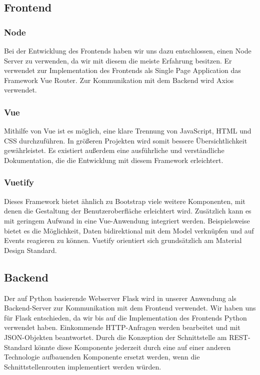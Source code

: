 \subsection{Frontend}

\subsubsection{Node}

Bei der Entwicklung des Frontends haben wir uns dazu entschlossen, einen Node Server zu verwenden, da wir mit diesem die meiste Erfahrung besitzen. Er verwendet zur Implementation des Frontends als Single Page Application das Framework Vue Router. Zur Kommunikation mit dem Backend wird Axios verwendet.

\subsubsection{Vue}

Mithilfe von Vue ist es möglich, eine klare Trennung von JavaScript, HTML und CSS durchzuführen. In größeren Projekten wird somit bessere Übersichtlichkeit gewährleistet. Es existiert außerdem eine ausführliche und verständliche Dokumentation, die die Entwicklung mit diesem Framework erleichtert.

\subsubsection{Vuetify}

Dieses Framework bietet ähnlich zu Bootstrap viele weitere Komponenten, mit denen die Gestaltung der Benutzeroberfläche erleichtert wird. Zusätzlich kann es mit geringem Aufwand in eine Vue-Anwendung integriert werden. Beispielsweise bietet es die Möglichkeit, Daten bidirektional mit dem Model verknüpfen und auf Events reagieren zu können. Vuetify orientiert sich grundsätzlich am Material Design Standard.

\subsection{Backend}

Der auf Python basierende Webserver Flask wird in unserer Anwendung als Backend-Server zur Kommunikation mit dem Frontend verwendet. Wir haben uns für Flask entschieden, da wir bis auf die Implementation des Frontends Python verwendet haben. Einkommende HTTP-Anfragen werden bearbeitet und mit JSON-Objekten beantwortet. Durch die Konzeption der Schnittstelle am REST-Standard könnte diese Komponente jederzeit durch eine auf einer anderen Technologie aufbauenden Komponente ersetzt werden, wenn die Schnittstellenrouten implementiert werden würden.


